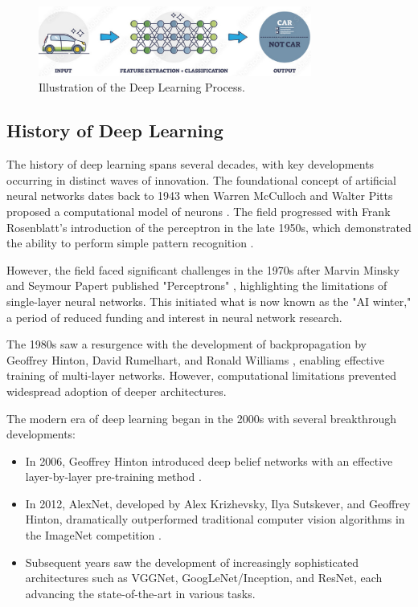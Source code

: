 \begin{figure}[H]
  \centering
  \includegraphics[width=0.8\textwidth]{Images/Chapter1/dl.png}
  \caption{Illustration of the Deep Learning Process. \cite{alltius2025deeplearning}}
  \label{fig:dl}
\end{figure}

\subsection{History of Deep Learning}
\label{sec:dl_history}
The history of deep learning spans several decades, with key developments occurring in distinct waves of innovation. The foundational concept of artificial neural networks dates back to 1943 when Warren McCulloch and Walter Pitts proposed a computational model of neurons \cite{mcculloch1943logical}. The field progressed with Frank Rosenblatt's introduction of the perceptron in the late 1950s, which demonstrated the ability to perform simple pattern recognition \cite{rosenblatt1958perceptron}.

However, the field faced significant challenges in the 1970s after Marvin Minsky and Seymour Papert published "Perceptrons" \cite{minsky1969perceptrons}, highlighting the limitations of single-layer neural networks. This initiated what is now known as the "AI winter," a period of reduced funding and interest in neural network research.

The 1980s saw a resurgence with the development of backpropagation by Geoffrey Hinton, David Rumelhart, and Ronald Williams \cite{rumelhart1986learning}, enabling effective training of multi-layer networks. However, computational limitations prevented widespread adoption of deeper architectures.

The modern era of deep learning began in the 2000s with several breakthrough developments:
\begin{itemize}
  \item In 2006, Geoffrey Hinton introduced deep belief networks with an effective layer-by-layer pre-training method \cite{hinton2006fast}.
  \item In 2012, AlexNet, developed by Alex Krizhevsky, Ilya Sutskever, and Geoffrey Hinton, dramatically outperformed traditional computer vision algorithms in the ImageNet competition \cite{krizhevsky2012imagenet}.
  \item Subsequent years saw the development of increasingly sophisticated architectures such as VGGNet, GoogLeNet/Inception, and ResNet, each advancing the state-of-the-art in various tasks.
\end{itemize}

